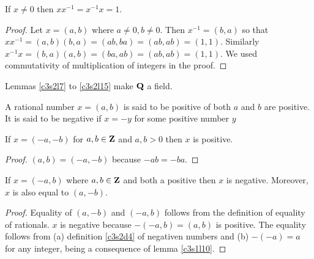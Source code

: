 \begin{lem}\label{c3s2l15}
If $x \ne 0$ then $xx^{-1} = x^{-1}x = 1$.
\end{lem}
\begin{proof}
Let $x = (a, b)$ where $a \ne 0, b \ne 0$. Then $x^{-1} = (b, a)$ so that
$xx^{-1} = (a, b)(b, a) = (ab, ba) = (ab, ab) = (1, 1)$. Similarly $x^{-1}x
= (b, a)(a, b) = (ba, ab) = (ab, ab) = (1, 1)$. We used commutativity of
multiplication of integers in the proof.
\end{proof}

Lemmas \ref{c3s2l7} to \ref{c3s2l15} make $\mathbf{Q}$ a field.

\begin{defn}\label{c3s2d7}
A rational number $x = (a, b)$ is said to be positive of both $a$ and $b$
are positive. It is said to be negative if $x = -y$ for some positive 
number $y$
\end{defn}

\begin{lem}\label{c3s2l16}
If $x = (-a, -b)$ for $a, b \in \mathbf{Z}$ and $a, b > 0$ then $x$ is positive.
\end{lem}
\begin{proof}
$(a, b) = (-a, -b)$ because $-ab = -ba$.
\end{proof}

\begin{lem}\label{c3s2l17}
If $x = (-a, b)$ where $a, b \in \mathbf{Z}$ and both a positive then $x$ is 
negative. Moreover, $x$ is also equal to $(a, -b)$.
\end{lem}
\begin{proof}
Equality of $(a, -b)$ and $(-a, b)$ follows from the definition of equality
of rationals. $x$ is negative because $-(-a, b) = (a, b)$ is positive. The
equality follows from (a) definition \ref{c3s2d4} of negativen numbers and
(b) $-(-a) = a$ for any integer, being a consequence of lemma 
\ref{c3s1l10}.
\end{proof}

